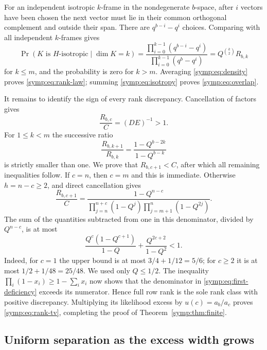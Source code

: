 For an independent isotropic $k$-frame in the nondegenerate $b$-space,
after $i$ vectors have been chosen the next vector must lie in their common
orthogonal complement and outside their span.  There are
$q^{b-i}-q^i$ choices.  Comparing with all independent $k$-frames gives
\begin{equation}
 \Pr(K\text{ is }H\text{-isotropic}\mid\dim K=k)
 =\frac{\prod_{i=0}^{k-1}(q^{b-i}-q^i)}
        {\prod_{i=0}^{k-1}(q^b-q^i)}
 =Q^{\binom{k}{2}}R_{b,k}
 \label{symp:eq:isotropy}
\end{equation}
for $k\le m$, and the probability is zero for $k>m$.  Averaging
\eqref{symp:eq:density} proves \eqref{symp:eq:rank-law}; summing
\eqref{symp:eq:isotropy} proves \eqref{symp:eq:overlap}.

It remains to identify the sign of every rank discrepancy.  Cancellation
of factors gives
\begin{equation}
 \frac{R_{b,c}}C=(DE)^{-1}>1.
 \label{symp:eq:fullrank-ratio}
\end{equation}
For $1\le k<m$ the successive ratio
\[
 \frac{R_{b,k+1}}{R_{b,k}}
  =\frac{1-Q^{b-2k}}{1-Q^{b-k}}
\]
is strictly smaller than one.  We prove that $R_{b,c+1}<C$, after which
all remaining inequalities follow.  If $c=n$, then $c=m$ and this is
immediate.  Otherwise $h=n-c\ge2$, and direct cancellation gives
\begin{equation}
 \frac{R_{b,c+1}}C
 =\frac{1-Q^{n-c}}
 {\displaystyle\prod_{j=n}^{n+c}(1-Q^j)
  \displaystyle\prod_{j=m+1}^{n}(1-Q^{2j})}.
 \label{symp:eq:first-deficiency}
\end{equation}
The sum of the quantities subtracted from one in this denominator, divided
by $Q^{n-c}$, is at most
\begin{equation}
 \frac{Q^c(1-Q^{c+1})}{1-Q}
 +\frac{Q^{2c+2}}{1-Q^2}<1.
 \label{symp:eq:sign-bound}
\end{equation}
Indeed, for $c=1$ the upper bound is at most
$3/4+1/12=5/6$; for $c\ge2$ it is at most
$1/2+1/48=25/48$.  We used only $Q\le1/2$.  The inequality
$\prod_i(1-x_i)\ge1-\sum_i x_i$ now shows that the denominator in
\eqref{symp:eq:first-deficiency} exceeds its numerator.  Hence full row
rank is the sole rank class with positive discrepancy.  Multiplying its
likelihood excess by $u(c)=a_b/a_c$ proves
\eqref{symp:eq:rank-tv}, completing the proof of
Theorem~\ref{symp:thm:finite}.

\subsection{Uniform separation as the excess width grows}

